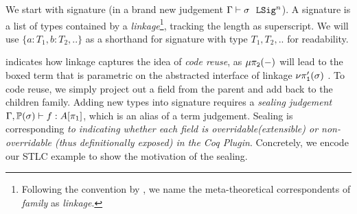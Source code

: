We start with signature (in a brand new judgement $ {\Gamma} \vdash {\sigma} \ \ \texttt{LSig}^{n} $). A signature is a list of types contained by a \textit{linkage}\footnote{Following the convention by \citet{zm2017}, we name the meta-theoretical correspondents of \textit{family} as \textit{linkage}.}, tracking the length as superscript.   We will use $\{a : T_1, b : T_2, ..\}$ as a shorthand for signature with type $T_1, T_2, ..$ for readability. 

 indicates how linkage captures the idea of \textit{code reuse}, as $\mu\pi_{\texttt{2}}({-})$ will lead to the boxed term that is parametric on the abstracted interface of linkage $\nu\pi'_{\texttt{1}}({\sigma})$ . To code reuse, we simply project out a field from the parent and add back to the children family.
\newpage 
Adding new types into signature  requires a \textit{sealing judgement} $  {{\Gamma}, \mathbb{P}({\sigma})} \vdash {{f}} : {{{A}}\!\left[{\pi_1}\right]}  $, which is an alias of a term judgement. Sealing is corresponding \textit{to indicating whether each field is overridable(extensible) or non-overridable (thus definitionally exposed) in the Coq Plugin}. 
Concretely, we encode our STLC example to show the motivation of the sealing.




